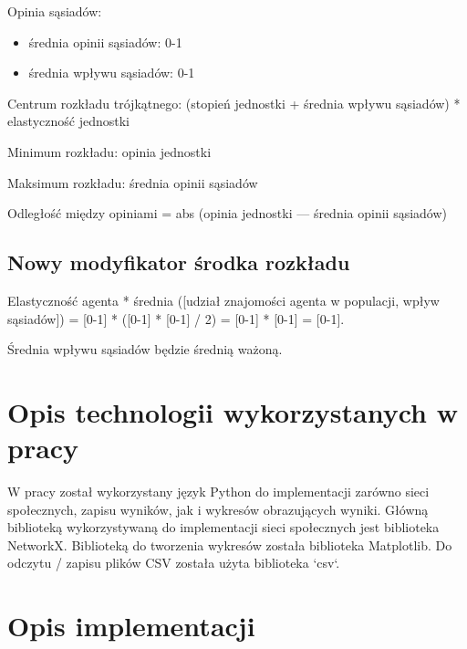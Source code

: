 \documentclass{wfiisul}
\begin{document}
Opinia sąsiadów:
\begin{itemize}
  \item średnia opinii sąsiadów: 0-1
  \item średnia wpływu sąsiadów: 0-1
\end{itemize}

Centrum rozkładu trójkątnego: (stopień jednostki + średnia wpływu sąsiadów) * elastyczność jednostki

Minimum rozkładu: opinia jednostki

Maksimum rozkładu: średnia opinii sąsiadów

Odległość między opiniami = abs (opinia jednostki — średnia opinii sąsiadów)

\section{Nowy modyfikator środka rozkładu}

Elastyczność agenta * średnia ([udział znajomości agenta w populacji, wpływ sąsiadów]) = [0-1] * ([0-1] * [0-1] / 2) = [0-1] * [0-1] = [0-1].

Średnia wpływu sąsiadów będzie średnią ważoną.


\chapter{Opis technologii wykorzystanych w pracy}

W pracy został wykorzystany język Python do implementacji zarówno sieci społecznych, zapisu wyników, jak i wykresów obrazujących wyniki. 
Główną biblioteką wykorzystywaną do implementacji sieci społecznych jest biblioteka NetworkX. 
Biblioteką do tworzenia wykresów została biblioteka Matplotlib. 
Do odczytu / zapisu plików CSV została użyta biblioteka `csv`. 


\chapter{Opis implementacji}
\end{document}
